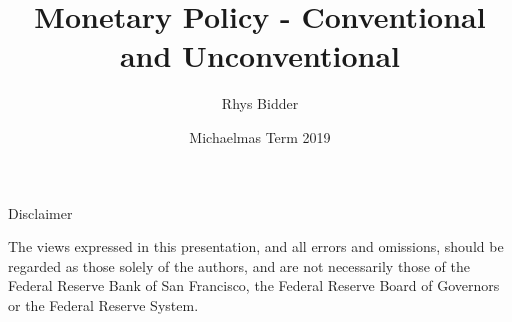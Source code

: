 \documentclass{beamer}
\begin{document}
\title[Monetary Policy]{Monetary Policy - Conventional and Unconventional}
\author[Bidder]{Rhys Bidder}
\date{Michaelmas Term 2019}
\maketitle


\begin{frame}{Disclaimer}

The views expressed in this presentation, and all errors and omissions, should be regarded as those solely of the authors, and are not necessarily those of the Federal Reserve Bank of San Francisco, the Federal Reserve Board of Governors or the Federal Reserve System.

\end{frame}





\appendix

\end{document}
